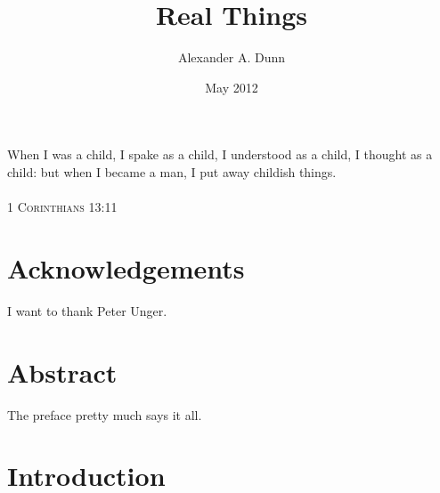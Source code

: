 \documentclass[12pt,twoside]{reedfancy}
\title{Real Things}
\author{Alexander A. Dunn}
\date{May 2012}
\newenvironment{epigram}{%
	\begin{minipage}[c]{0.75\textwidth}
	\vspace{2.5in}
	\begin{spacing}{1}
	\begin{list}{}{%
	\setlength{\labelwidth}{0pt}
	\setlength{\leftmargin}{1in}
	\setlength{\rightmargin}{.5in}}
	\item[]
	}{%
	\end{list}
	\end{spacing}
	\end{minipage}
	\newline
	}
\begin{document}
  \maketitle
  \frontmatter %
  \pagestyle{empty} %

\begin{epigram}
When I was a child, I spake as a child, I understood as a child, I thought as a child: but when I became a man, I put away childish things. \\
\\
\textsc{1 Corinthians 13:11}
\end{epigram}

\begin{spacing}{1.25}

    \chapter*{Acknowledgements}
	I want to thank Peter Unger.


    \tableofcontents

	\chapter*{Abstract}
	The preface pretty much says it all.

	\mainmatter %
	\pagestyle{fancyplain} %
  
\chapter{Introduction}


\end{spacing}
\end{document}
